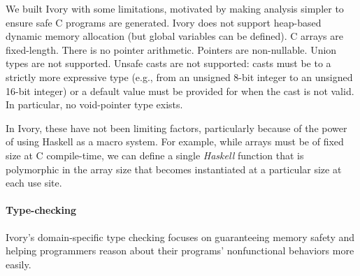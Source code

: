 We built Ivory with some limitations, motivated by making analysis simpler to
ensure safe C programs are generated.  Ivory does not support heap-based dynamic
memory allocation (but global variables can be defined).  C arrays are
fixed-length.  There is no pointer arithmetic.  Pointers are non-nullable.
Union types are not supported.  Unsafe casts are not supported: casts must be to
a strictly more expressive type (e.g., from an unsigned 8-bit integer to an
unsigned 16-bit integer) or a default value must be provided for when the cast
is not valid.  In particular, no void-pointer type exists.

In Ivory, these have not been limiting factors, particularly because of the
power of using Haskell as a macro system.  For example, while arrays must be of
fixed size at C compile-time, we can define a single \emph{Haskell} function
that is polymorphic in the array size that becomes instantiated at a particular
size at each use site.  %


\paragraph{Type-checking}
Ivory's domain-specific type checking focuses on guaranteeing memory
safety and helping programmers reason about their programs' nonfunctional
behaviors more easily.



